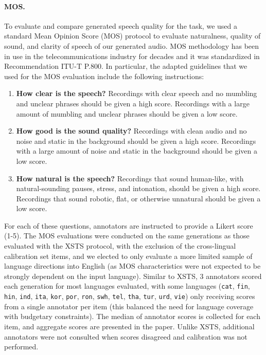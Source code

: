 \paragraph{MOS.} To evaluate and compare generated speech quality for the \sst task, we used a standard Mean Opinion Score (MOS) protocol to evaluate naturalness, quality of sound, and clarity of speech of our generated audio. MOS methodology has been in use in the telecommunications industry for decades and it was standardized in Recommendation ITU-T P.800. 
In particular, the adapted guidelines that we used for the MOS evaluation include the following instructions:
\begin{enumerate}
\item \textbf{How clear is the speech? }
Recordings with clear speech and no mumbling and unclear phrases should be given a high score. Recordings with a large amount of mumbling and unclear phrases should be given a low score.
\item \textbf{How good is the sound quality?}
Recordings with clean audio and no noise and static in the background should be given a high score. Recordings with a large amount of noise and static in the background should be given a low score.
\item \textbf{How natural is the speech?}
Recordings that sound human-like, with natural-sounding pauses, stress, and intonation, should be given a high score. Recordings that sound robotic, flat, or otherwise unnatural should be given a low score. 
\end{enumerate}

For each of these questions, annotators are instructed to provide a Likert score (1-5). The MOS evaluations were conducted on the same generations as those evaluated with the XSTS protocol, with the exclusion of the cross-lingual calibration set items, and we elected to only evaluate a more limited sample of language directions into English (as MOS characteristics were not expected to be strongly dependent on the input language). Similar to XSTS, 3 annotators scored each generation for most languages evaluated, with some languages (\texttt{cat}, \texttt{fin}, \texttt{hin}, \texttt{ind}, \texttt{ita}, \texttt{kor}, \texttt{por}, \texttt{ron}, \texttt{swh}, \texttt{tel}, \texttt{tha}, \texttt{tur}, \texttt{urd}, \texttt{vie}) only receiving scores from a single annotator per item (this balanced the need for language coverage with budgetary constraints). The median of annotator scores is collected for each item, and aggregate scores are presented in the paper. Unlike XSTS, additional annotators were not consulted when scores disagreed and calibration was not performed.


